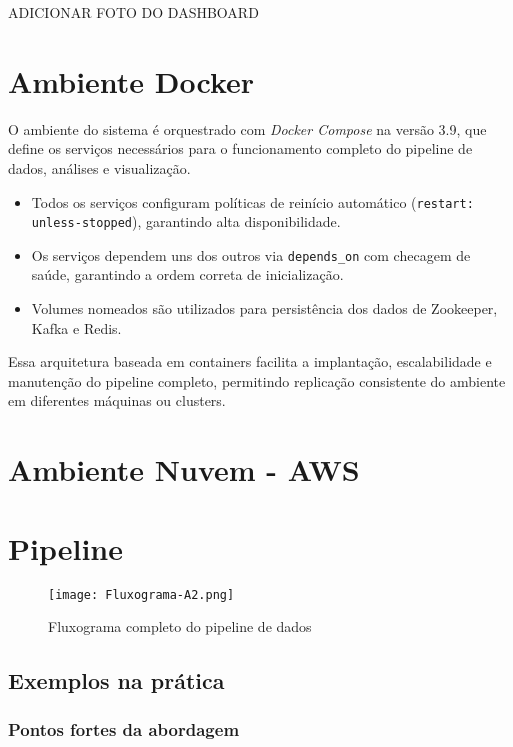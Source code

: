 \documentclass[a4paper,12pt]{article}
\begin{document}
ADICIONAR FOTO DO DASHBOARD


\section{Ambiente Docker}

O ambiente do sistema é orquestrado com \textit{Docker Compose} na versão 3.9, que define os serviços necessários para o funcionamento completo do pipeline de dados, análises e visualização.


\begin{itemize}
    \item Todos os serviços configuram políticas de reinício automático (\texttt{restart: unless-stopped}), garantindo alta disponibilidade.
    \item Os serviços dependem uns dos outros via \texttt{depends\_on} com checagem de saúde, garantindo a ordem correta de inicialização.
    \item Volumes nomeados são utilizados para persistência dos dados de Zookeeper, Kafka e Redis.
\end{itemize}

Essa arquitetura baseada em containers facilita a implantação, escalabilidade e manutenção do pipeline completo, permitindo replicação consistente do ambiente em diferentes máquinas ou clusters.


\section{Ambiente Nuvem - AWS}


\section{Pipeline}

\begin{figure}[H]
    \centering
    \texttt{[image: Fluxograma-A2.png]}
    \caption{Fluxograma completo do pipeline de dados}
    \label{fig:pipeline}
\end{figure}

\subsection*{Exemplos na prática}

\subsubsection*{Pontos fortes da abordagem}
\end{document}
